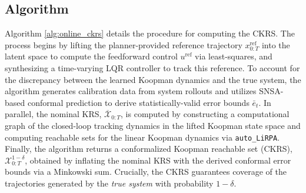 \subsection{Algorithm}\label{app:algorithm}

Algorithm \ref{alg:online_ckrs} details the procedure for computing the CKRS. The process begins by lifting the planner-provided reference trajectory $x_{0:T}^\textrm{ref}$ into the latent space to compute the feedforward control $u^\textrm{ref}$ via least-squares, and synthesizing a time-varying LQR controller to track this reference. To account for the discrepancy between the learned Koopman dynamics and the true system, the algorithm generates calibration data from system rollouts and utilizes SNSA-based conformal prediction to derive statistically-valid error bounds $\bar e_t$. In parallel, the nominal KRS, $\overline{\mathcal{X}}_{0:T}$, is computed by constructing a computational graph of the closed-loop tracking dynamics in the lifted Koopman state space and computing reachable sets for the linear Koopman dynamics via \texttt{auto\_LiRPA}. Finally, the algorithm returns a conformalized Koopman reachable set (CKRS), $\mathcal{X}_{0:T}^{1-\delta}$, obtained by inflating the nominal KRS with the derived conformal error bounds via a Minkowski sum. Crucially, the CKRS guarantees coverage of the trajectories generated by the \textit{true system} with probability $1-\delta$.

